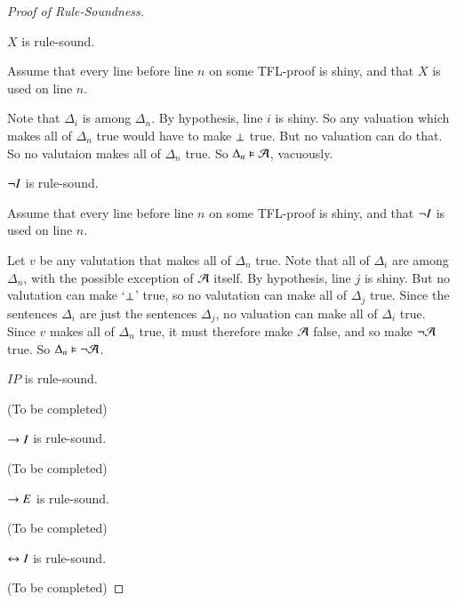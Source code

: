 \documentclass[12pt, a4paper, oneside, openright, titlepage]{book}
\begin{document}
\begin{proof}[Proof of Rule-Soundness]
    \begin{claim}[7]
        $X$ is rule-sound.
    \end{claim}
    Assume that every line before line $n$ on some TFL-proof is shiny, and that $X$ is used on line $n$.
    \begin{fitchproof}
         
    \end{fitchproof}
    Note that $\Delta_i$ is among $\Delta_n$. By hypothesis, line $i$ is shiny. So any valuation which makes all of $\Delta_n$ true would have to make $\bot$ true. But no valuation can do that. So no valutaion makes all of $\Delta_n$ true. So $\Delta_n \vDash \mathcal{A}$, vacuously.


    \begin{claim}[8]
        $\neg I$ is rule-sound.
    \end{claim}
    Assume that every line before line $n$ on some TFL-proof is shiny, and that $\neg I$ is used on line $n$.
    \begin{fitchproof}
        \open
        \close
         
    \end{fitchproof}
    Let $v$ be any valutation that makes all of $\Delta_n$ true. Note that all of $\Delta_i$ are among $\Delta_n$, with the possible exception of $\mathcal{A}$ itself. By hypothesis, line $j$ is shiny. But no valutation can make `$\bot$' true, so no valutation can make all of $\Delta_j$ true. Since the sentences $\Delta_i$ are just the sentences $\Delta_j$, no valuation can make all of $\Delta_i$ true. Since $v$ makes all of $\Delta_n$ true, it must therefore make $\mathcal{A}$ false, and so make $\neg \mathcal{A}$ true. So $\Delta_n\vDash \neg\mathcal{A}$.

    \begin{claim}[9]
        $IP$ is rule-sound.
    \end{claim}
    (To be completed)

    \begin{claim}[10]
        $\rightarrow I$ is rule-sound.
    \end{claim}
    (To be completed)


    \begin{claim}[11]
        $\rightarrow E$ is rule-sound.
    \end{claim}
    (To be completed)


    \begin{claim}[12]
        $\leftrightarrow I$ is rule-sound.
    \end{claim}
    (To be completed)



\end{proof}
\end{document}
